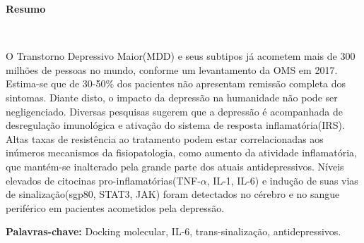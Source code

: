 \begin{flushleft}
\Huge\bfseries{Resumo} 
\end{flushleft}

\vspace{0.25cm}
$\!$
\noindent

 \\

O Transtorno Depressivo Maior(MDD) e seus subtipos já acometem mais de 300 milhões de pessoas no mundo, conforme um levantamento da OMS em 2017. Estima-se que de 30-50$\%$ dos pacientes não apresentam remissão completa dos sintomas. Diante disto, o impacto da depressão na humanidade não pode ser negligenciado. Diversas pesquisas sugerem que a depressão é acompanhada de desregulação imunológica e ativação do sistema de resposta inflamatória(IRS). Altas taxas de resistência ao tratamento podem estar correlacionadas aos inúmeros mecanismos da fisiopatologia, como aumento da atividade inflamatória, que mantém-se inalterado pela grande parte dos atuais antidepressivos. Níveis elevados de citocinas pro-inflamatórias(TNF-$\alpha$, IL-1, IL-6) e indução de suas vias de sinalização(sgp80, STAT3, JAK) foram detectados no cérebro e no sangue periférico em pacientes acometidos pela depressão. 

\vspace{1cm}

\hspace{-1.3cm}\textbf{Palavras-chave:} Docking molecular, IL-6, trans-sinalização, antidepressivos.
